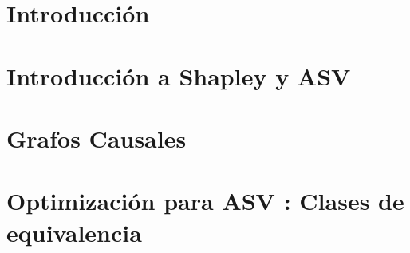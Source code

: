 \documentclass{article}
\begin{document}

\def\autor{Ezequiel Companeetz}
\def\tituloTesis{Optimización de ASV para árboles de decisión}
\def\runtitulo{Optimización de ASV para árboles de decisión}
\def\runtitle{ASV optimization for Decision Trees}
\def\director{Santiago Cifuentes}
\def\codirector{Sergio Abriola}
\def\lugar{Buenos Aires, 2025}


\pagestyle{empty}


\cleardoublepage


\cleardoublepage
\tableofcontents

\pagestyle{headings}


\section{Introducción}



\section{Introducción a Shapley y ASV}\label{Section:ComplejidadShap}



\newpage

\section{Grafos Causales}\label{Section:RedesBayesianas}



\newpage

\section{Optimización para ASV : Clases de equivalencia}\label{Section:HeuristicaASV}
\end{document}
